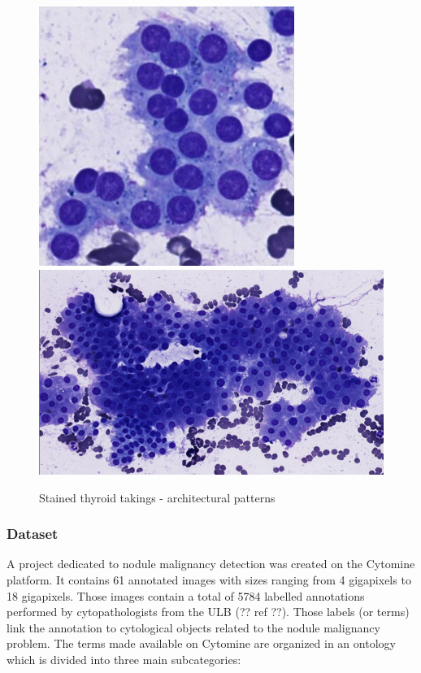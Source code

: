 \begin{figure}
{		\includegraphics[scale=0.5]{image/normal_pattern_1.png}
		\includegraphics[scale=0.5]{image/normal_pattern_2.png}
		\label{sfig:norm_patterns}
	}
	\caption{Stained thyroid takings - architectural patterns}
	\label{fig:intro_pattern_ex}
\end{figure}


\subsubsection{Dataset}
\label{sssec:detection_thyroid_dataset}
A project dedicated to nodule malignancy detection was created on the Cytomine platform. It contains 61 annotated images with sizes ranging from 4 gigapixels to 18 gigapixels. Those images contain a total of 5784 labelled annotations performed by cytopathologists from the ULB (?? ref ??). Those labels (or terms) link the annotation to cytological objects related to the nodule malignancy problem. The terms made available on Cytomine are organized in an ontology which is divided into three main subcategories:

